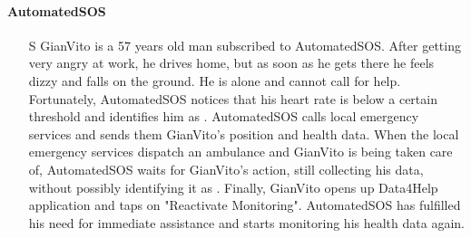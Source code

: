 \documentclass[../../rasd.tex]{subfiles}
\begin{document}
                \paragraph{AutomatedSOS}
                \begin{itemize}
                    \item[S\subs{7}] GianVito is a 57 years old man subscribed to AutomatedSOS. After getting very angry at work, he drives home, but as soon as he gets there he feels dizzy and falls on the ground. He is alone and cannot call for help. Fortunately, AutomatedSOS notices that his heart rate is below a certain threshold and identifies him as . AutomatedSOS calls local emergency services and sends them GianVito's position and health data. When the local emergency services dispatch an ambulance and GianVito is being taken care of, AutomatedSOS waits for GianVito's action, still collecting his data, without possibly identifying it as . Finally, GianVito opens up Data4Help application and taps on "Reactivate Monitoring". AutomatedSOS has fulfilled his need for immediate assistance and starts monitoring his health data again.
                \end{itemize}
\end{document}
